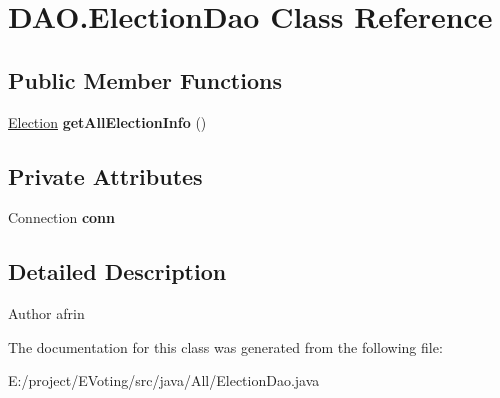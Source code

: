 \hypertarget{class_d_a_o_1_1_election_dao}{}\section{D\+A\+O.\+Election\+Dao Class Reference}
\label{class_d_a_o_1_1_election_dao}
\subsection*{Public Member Functions}
\begin{DoxyCompactItemize}
\item 
\mbox{\label{class_d_a_o_1_1_election_dao_a54f6fe0c1a589546bbdddced3d8f6dec}} 
\mbox{\hyperlink{class_models_1_1_election}{Election}} {\bfseries get\+All\+Election\+Info} ()
\end{DoxyCompactItemize}
\subsection*{Private Attributes}
\begin{DoxyCompactItemize}
\item 
\mbox{\label{class_d_a_o_1_1_election_dao_a749744f59ab13e5c9c9ff8409184c192}} 
Connection {\bfseries conn}
\end{DoxyCompactItemize}


\subsection{Detailed Description}
\begin{DoxyAuthor}{Author}
afrin 
\end{DoxyAuthor}


The documentation for this class was generated from the following file\+:\begin{DoxyCompactItemize}
\item 
E\+:/project/\+E\+Voting/src/java/\+All/Election\+Dao.\+java\end{DoxyCompactItemize}
